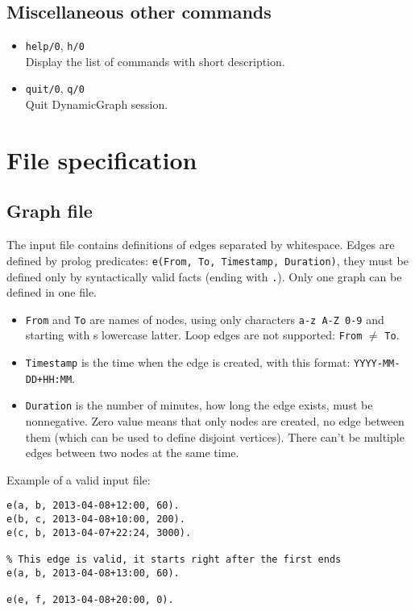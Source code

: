 \documentclass[11pt, a4paper,draft]{article}
\newcommand{\pl}[1]{\texttt{#1}} %
\theoremstyle{plain}
\theoremstyle{definition}
\theoremstyle{remark}
\begin{document}
\subsection{Miscellaneous other commands}

\begin{itemize}
\item \pl{help/0}, \pl{h/0} \\
Display the list of commands with short description.

\item \pl{quit/0}, \pl{q/0} \\
Quit DynamicGraph session.
\end{itemize}

\section{File specification}
\label{sec:files}

\subsection{Graph file}
\label{sec:files-graph}

The input file contains definitions of edges separated by whitespace.
Edges are defined by prolog predicates: \pl{e(From, To, Timestamp, Duration)},
they must be defined only by syntactically valid facts (ending with \pl{.}).
Only one graph can be defined in one file.

\begin{itemize}
	\item \pl{From} and \pl{To} are names of nodes, using only characters \texttt{a-z A-Z 0-9}
		and starting with s lowercase latter.	
		Loop edges are not supported: \pl{From} $\ne$ \pl{To}.
	\item \pl{Timestamp} is the time when the edge is created,
		with this format: \pl{YYYY-MM-DD+HH:MM}.
	\item \pl{Duration} is the number of minutes, how long the edge exists, must be nonnegative.
		Zero value means that only nodes are created, no edge between them (which
        can be used to define disjoint vertices).
		There can't be multiple edges between two nodes at the same time.
\end{itemize}
Example of a valid input file:

\begin{verbatim}
e(a, b, 2013-04-08+12:00, 60).
e(b, c, 2013-04-08+10:00, 200).
e(c, b, 2013-04-07+22:24, 3000).

% This edge is valid, it starts right after the first ends
e(a, b, 2013-04-08+13:00, 60).

e(e, f, 2013-04-08+20:00, 0).
\end{verbatim}
\end{document}
